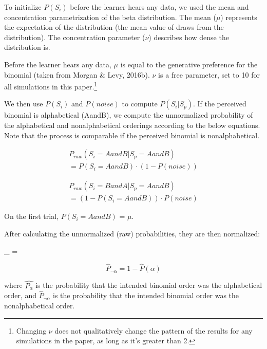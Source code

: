 \documentclass[10pt, letterpaper]{article}
\begin{document}
To initialize \(P(S_i)\) before the learner hears any data, we used the
mean and concentration parametrization of the beta distribution. The
mean (\(\mu\)) represents the expectation of the distribution (the mean
value of draws from the distribution). The concentration parameter
(\(\nu\)) describes how dense the distribution is.

Before the learner hears any data, \(\mu\) is equal to the generative
preference for the binomial (taken from Morgan \& Levy, 2016b). \(\nu\)
is a free parameter, set to 10 for all simulations in this
paper.\footnote{Changing \(\nu\) does not qualitatively change the
  pattern of the results for any simulations in the paper, as long as
  it's greater than 2.}

We then use \(P(S_i)\) and \(P(noise)\) to compute \(P(S_i|S_p)\). If
the perceived binomial is alphabetical (AandB), we compute the
unnormalized probability of the alphabetical and nonalphabetical
orderings according to the below equations. Note that the process is
comparable if the perceived binomial is nonalphabetical.

\begin{multline}
\label{eq:praw}
P_{raw}(S_i = AandB|S_p = AandB) \\ = P(S_i = AandB) \cdot (1 -  P(noise))
\end{multline}

\begin{multline}
\label{eq:prawtwo}
P_{raw}(S_i = BandA|S_p = AandB) \\ = (1 - P(S_i = AandB)) \cdot P(noise)
\end{multline}

On the first trial, \(P(S_i = AandB)\) = \(\mu\).

After calculating the unnormalized (raw) probabilities, they are then
normalized:

\begin{myequation}%
\label{eq:phatalpha}
_{\alpha} =  %
\end{myequation}

\begin{equation}
\label{eq:phatnotalpha}
\hat{P}_{\neg\alpha} = 1 - \hat{P}(\alpha)
\end{equation}

\noindent where \(\hat{P_\alpha}\) is the probability that the intended
binomial order was the alphabetical order, and \(\hat{P}_{\neg\alpha}\)
is the probability that the intended binomial order was the
nonalphabetical order.
\end{document}
